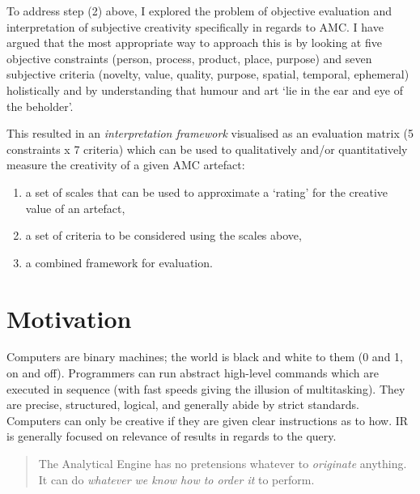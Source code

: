 To address step (2) above, I explored the problem of objective evaluation and interpretation of subjective creativity specifically in regards to \ac{AMC}. I have argued that the most appropriate way to approach this is by looking at five objective constraints (person, process, product, place, purpose) and seven subjective criteria (novelty, value, quality, purpose, spatial, temporal, ephemeral) holistically and by understanding that humour and art `lie in the ear and eye of the beholder'.

This resulted in an \emph{interpretation framework} visualised as an evaluation matrix (\num{5} constraints x \num{7} criteria) which can be used to qualitatively and/or quantitatively measure the creativity of a given \ac{AMC} artefact:

\begin{enumerate}
  \item a set of scales that can be used to approximate a `rating' for the creative value of an artefact,
  \item a set of criteria to be considered using the scales above,
  \item a combined framework for evaluation.
\end{enumerate}


\section{Motivation}

Computers are binary machines; the world is black and white to them (0 and 1, on and off). Programmers can run abstract high-level commands which are executed in sequence (with fast speeds giving the illusion of multitasking). They are precise, structured, logical, and generally abide by strict standards. Computers can only be creative if they are given clear instructions as to how. \acl{IR} is generally focused on relevance of results in regards to the query.

\begin{quotation}
  The Analytical Engine has no pretensions whatever to \textit{originate} anything. It can do \textit{whatever we know how to order it} to perform. 
\end{quotation}

